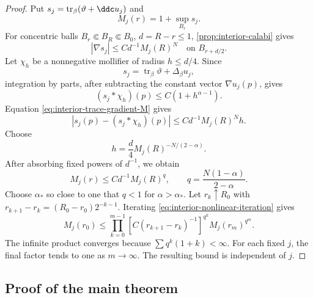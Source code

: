 \begin{proof}
Put $s_j=\operatorname{tr}_\beta(\vartheta+\ddc u_j)$ and
\[
  M_j(r)=1+\sup_{B_r}s_j.
\]
For concentric balls $B_r\Subset B_R\Subset B_0$, $d=R-r\leq1$, \cref{prop:interior-calabi} gives
\begin{equation}\label{eq:interior-trace-gradient-M}
  |\nabla s_j|\leq Cd^{-1}M_j(R)^N
  \quad\text{on }B_{r+d/2}.
\end{equation}
Let $\chi_h$ be a nonnegative mollifier of radius $h\leq d/4$. Since
\[
  s_j=\operatorname{tr}_\beta\vartheta+\Delta_\beta u_j,
\]
integration by parts, after subtracting the constant vector $\nabla u_j(p)$, gives
\[
  (s_j*\chi_h)(p)\leq C(1+h^{\alpha-1}).
\]
Equation \eqref{eq:interior-trace-gradient-M} gives
\[
  |s_j(p)-(s_j*\chi_h)(p)|
  \leq Cd^{-1}M_j(R)^Nh.
\]
Choose
\[
  h=\frac d4M_j(R)^{-N/(2-\alpha)}.
\]
After absorbing fixed powers of $d^{-1}$, we obtain
\begin{equation}\label{eq:interior-nonlinear-iteration}
  M_j(r)\leq Cd^{-1}M_j(R)^q,
  \qquad
  q=\frac{N(1-\alpha)}{2-\alpha}.
\end{equation}
Choose $\alpha_*$ so close to one that $q<1$ for $\alpha>\alpha_*$. Let $r_k\uparrow R_0$ with $r_{k+1}-r_k=(R_0-r_0)2^{-k-1}$. Iterating \eqref{eq:interior-nonlinear-iteration} gives
\[
  M_j(r_0)
  \leq
  \prod_{k=0}^{m-1}\left[C(r_{k+1}-r_k)^{-1}\right]^{q^k}
  M_j(r_m)^{q^m}.
\]
The infinite product converges because $\sum q^k(1+k)<\infty$. For each fixed $j$, the final factor tends to one as $m\to\infty$. The resulting bound is independent of $j$.
\end{proof}

\subsection{Proof of the main theorem}\label{sec:interior-main-proof}

